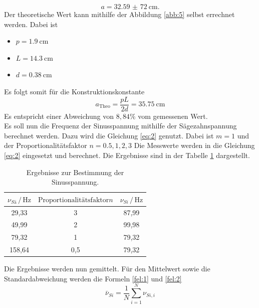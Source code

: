 \begin{equation*}
  a = \SI{32,59(72)}{\centi\meter}.
\end{equation*}
Der theoretische Wert kann mithilfe der Abbildung \ref{abb:5} selbst errechnet werden.
Dabei ist
\begin{itemize}
  \item $p = \SI{1.9}{\centi\meter}$
  \item $L = \SI{14.3}{\centi\meter}$
  \item $d = \SI{0.38}{\centi\meter}$
\end{itemize}
Es folgt somit für die Konstruktionskonstante
\begin{equation*}
  a_{\text{Theo}} = \frac{pL}{2d} = \SI{35.75}{\centi\meter}
\end{equation*}
Es entspricht einer Abweichung von $8,84 \%$ vom gemessenen Wert.\\
\newline
Es soll nun die Frequenz der Sinusspannung mithilfe der Sägezahnspannung
berechnet werden.
Dazu wird die Gleichung \ref{eq:2} genutzt. Dabei ist $m = 1$ und der
Proportionalitätsfaktor $n= 0.5, 1, 2, 3$
Die Messwerte werden in die Gleichung \ref{eq:2} eingesetzt und berechnet.
Die Ergebnisse sind in der Tabelle \ref{tab:3} dargestellt.
\begin{table}[H]
  \centering
  \caption{Ergebnisse zur Bestimmung der Sinusspannung.}
  \label{tab:3}
  \begin{tabular}{c c c}
\toprule
$\nu_{Sä} \,/\, \si{\hertz}$& $\text{Proportionalitätsfaktor} n$ & $\nu_{Si} \, /\, \si{\hertz}$\\
\midrule
29,33 & 3 & 87,99\\
49,99 & 2 & 99,98\\
79,32 & 1 & 79,32\\
158,64& 0,5& 79,32\\
\bottomrule
  \end{tabular}
\end{table}
Die Ergebnisse werden nun gemittelt.
Für den Mittelwert sowie die Standardabweichung werden die Formeln \ref{fel:1} und \ref{fel:2}
\begin{equation}
    \bar{\nu}_{Si}= \frac{1}{N} \sum_{i=1}^{N} \nu_{Si,i}
    \label{fel:1}
\end{equation}

